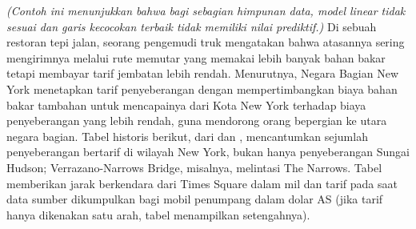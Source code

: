 \begin{exercises}
  \item
    \textit{(Contoh ini menunjukkan bahwa bagi sebagian himpunan data, model
    linear tidak sesuai dan garis kecocokan terbaik tidak memiliki nilai
    prediktif.)}
    Di sebuah restoran tepi jalan, seorang pengemudi truk mengatakan bahwa
    atasannya sering mengirimnya melalui rute memutar yang memakai lebih banyak
    bahan bakar tetapi membayar tarif jembatan lebih rendah.
    Menurutnya, Negara Bagian New York menetapkan tarif penyeberangan dengan
    mempertimbangkan biaya bahan bakar tambahan untuk mencapainya dari Kota New
    York terhadap biaya penyeberangan yang lebih rendah, guna mendorong orang
    bepergian ke utara negara bagian.
    Tabel historis berikut, dari \cite{CostOfTolls} dan \cite{GoogleMaps},
    mencantumkan sejumlah penyeberangan bertarif di wilayah New York, bukan hanya
    penyeberangan Sungai Hudson; Verrazano-Narrows Bridge, misalnya, melintasi
    The Narrows. Tabel memberikan jarak berkendara dari Times Square dalam mil
    dan tarif pada saat data sumber dikumpulkan bagi mobil penumpang dalam dolar
    AS (jika tarif hanya dikenakan satu arah, tabel menampilkan setengahnya).
    \begin{center}
      \small

\end{center}
\end{exercises}
